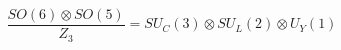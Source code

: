 \begin{equation}
\frac{SO(6)\otimes SO(5)}{Z_3}=SU_C(3)\otimes SU_L(2)\otimes  U_Y(1)
\end{equation}

